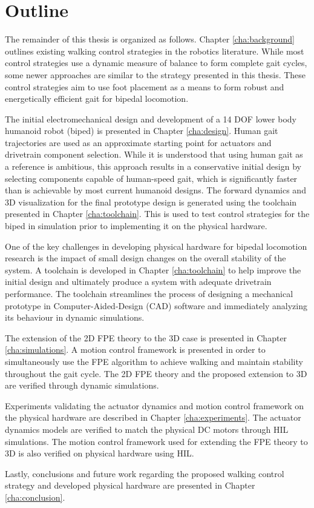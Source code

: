 
\section{Outline} %
\label{sec:outline}
The remainder of this thesis is organized as follows. Chapter \ref{cha:background} outlines existing walking control strategies in the robotics literature. While most control strategies use a dynamic measure of balance to form complete gait cycles, some newer approaches are similar to the strategy presented in this thesis. These control strategies aim to use foot placement as a means to form robust and energetically efficient gait for bipedal locomotion. 

The initial electromechanical design and development of a 14 DOF lower body humanoid robot (biped) is presented in Chapter \ref{cha:design}. Human gait trajectories are used as an approximate starting point for actuators and drivetrain component selection. While it is understood that using human gait as a reference is ambitious, this approach results in a conservative initial design by selecting components capable of human-speed gait, which is significantly faster than is achievable by most current humanoid designs. The forward dynamics and 3D visualization for the final prototype design is generated using the toolchain presented in Chapter \ref{cha:toolchain}. This is used to test control strategies for the biped in simulation prior to implementing it on the physical hardware.

One of the key challenges in developing physical hardware for bipedal locomotion research is the impact of small design changes on the overall stability of the system. A toolchain is developed in Chapter \ref{cha:toolchain} to help improve the initial design and ultimately produce a system with adequate drivetrain performance. The toolchain streamlines the process of designing a mechanical prototype in Computer-Aided-Design (CAD) software and immediately analyzing its behaviour in dynamic simulations.

The extension of the 2D FPE theory to the 3D case is presented in Chapter \ref{cha:simulations}. A motion control framework is presented in order to simultaneously use the FPE algorithm to achieve walking and maintain stability throughout the gait cycle. The 2D FPE theory and the proposed extension to 3D are verified through dynamic simulations. 

Experiments validating the actuator dynamics and motion control framework on the physical hardware are described in Chapter \ref{cha:experiments}. The actuator dynamics models are verified to match the physical DC motors through HIL simulations. The motion control framework used for extending the FPE theory to 3D is also verified on physical hardware using HIL.  

Lastly, conclusions and future work regarding the proposed walking control strategy and developed physical hardware are presented in Chapter \ref{cha:conclusion}. 

